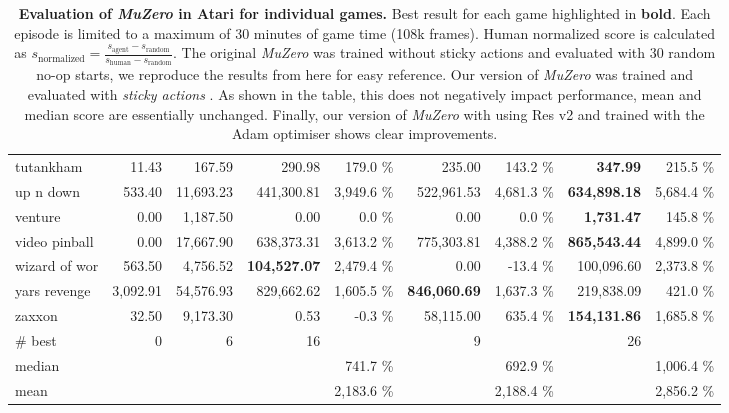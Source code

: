 \documentclass{article}
\newcommand{\muzero}{\emph{MuZero}}
\begin{document}
\begin{table}
\begin{center}
\begin{tabularx}{\textwidth}{X| r r r r r r r r}
tutankham &11.43 & 167.59 & 290.98 & 179.0 \% & 235.00 & 143.2 \% & \textbf{347.99} & 215.5 \%\\
up n down &533.40 & 11,693.23 & 441,300.81 & 3,949.6 \% & 522,961.53 & 4,681.3 \% & \textbf{634,898.18} & 5,684.4 \%\\
venture &0.00 & 1,187.50 & 0.00 & 0.0 \% & 0.00 & 0.0 \% & \textbf{1,731.47} & 145.8 \%\\
video pinball &0.00 & 17,667.90 & 638,373.31 & 3,613.2 \% & 775,303.81 & 4,388.2 \% & \textbf{865,543.44} & 4,899.0 \%\\
wizard of wor &563.50 & 4,756.52 & \textbf{104,527.07} & 2,479.4 \% & 0.00 & -13.4 \% & 100,096.60 & 2,373.8 \%\\
yars revenge &3,092.91 & 54,576.93 & 829,662.62 & 1,605.5 \% & \textbf{846,060.69} & 1,637.3 \% & 219,838.09 & 421.0 \%\\
zaxxon &32.50 & 9,173.30 & 0.53 & -0.3 \% & 58,115.00 & 635.4 \% & \textbf{154,131.86} & 1,685.8 \%\\
\midrule
\# best & 0 & 6 & 16 &  & 9 &  & 26\\
median&  &  & & 741.7 \% & & 692.9 \% & & 1,006.4 \% \\
mean&  &  & & 2,183.6 \% & & 2,188.4 \% & & 2,856.2 \% \\
\bottomrule
\end{tabularx}
\end{center}
 
\caption{
\label{tab:atari-per-level}
\textbf{Evaluation of \muzero{} in Atari for individual games.} Best result for each game highlighted in \textbf{bold}. Each episode is limited to a maximum of 30 minutes of game time (108k frames). Human normalized score is calculated as $s_{\text{normalized}} = \frac{s_{\text{agent}} - s_{\text{random}}}{s_{\text{human}} - s_{\text{random}}}$. The original \muzero{} was trained without sticky actions and evaluated with 30 random no-op starts, we reproduce the results from \cite{muzero} here for easy reference. Our version of \muzero{} was trained and evaluated with \emph{sticky actions} \cite{Marlos2017Atari}. As shown in the table, this does not negatively impact performance, mean and median score are essentially unchanged. Finally, our version of \muzero{} with using Res v2 \cite{resv2} and trained with the Adam optimiser shows clear improvements.
}
\end{table}
\end{document}
